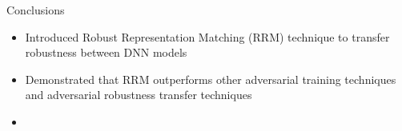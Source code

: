 \documentclass{beamer}
\begin{document}


\begin{frame}{Conclusions}
	
	\begin{itemize}
		\item Introduced Robust Representation Matching (RRM) technique to transfer robustness between DNN models
		\item Demonstrated that RRM outperforms other adversarial training techniques and adversarial robustness transfer techniques
	\end{itemize}
	
\end{frame}



\begin{frame}{}
	
	\begin{itemize}
		\item 
	\end{itemize}
	
\end{frame}

\end{document}
